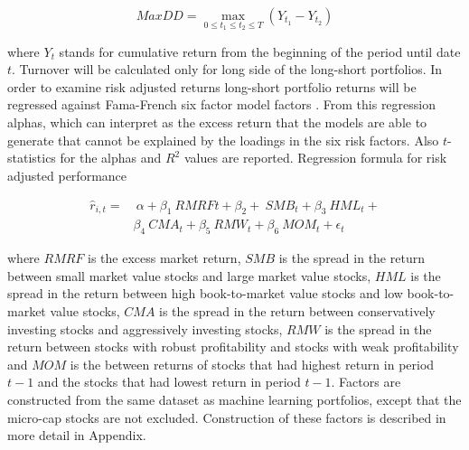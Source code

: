 \documentclass{article}
\begin{document}
\begin{equation}
\label{eq:maxDD}
MaxDD = \max\limits_{0\leq t_1\leq t_2\leq T} (Y_{t_1} - Y_{t_2})
\end{equation}

where $Y_t$ stands for cumulative return from the beginning of the period until date $t$. Turnover will be calculated only for long side of the long-short portfolios. In order to examine risk adjusted returns long-short portfolio returns will be regressed against Fama-French \citeyear{FAMA20151} six factor model factors \footnotemark. From this regression alphas, which can interpret as the excess return that the models are able to generate that cannot be explained by the loadings in the six risk factors. Also $t$-statistics for the alphas and $R^2$ values are reported. Regression formula for risk adjusted performance \par

\begin{equation}
\label{eq:FFRegFormula}
\begin{split}
\hat r_{i, t} = 	& \ \alpha+ \beta_{1} \ RMRF{t} + \beta_{2} + \ SMB_{t} + \beta_{3} \ HML_{t} + \\
		&  \beta_{4} \ CMA_{t} +  \beta_{5} \ RMW_{t} + \beta_{6} \ MOM_{t} + \epsilon_{t}
\end{split}
\end{equation}

where $RMRF$ is the excess market return, $SMB$ is the spread in the return between small market value stocks and large market value stocks, $HML$ is the spread in the return between high book-to-market value stocks and low book-to-market value stocks, $CMA$ is the spread in the return between conservatively investing stocks and aggressively investing stocks, $RMW$ is the spread in the return between stocks with robust profitability and stocks with weak profitability and $MOM$ is the between returns of stocks that had highest return in period $t-1$ and the stocks that had lowest return in period $t-1$. Factors are constructed from the same dataset as machine learning portfolios, except that the micro-cap stocks are not excluded. Construction of these factors is described in more detail in Appendix. \par

\end{document}
